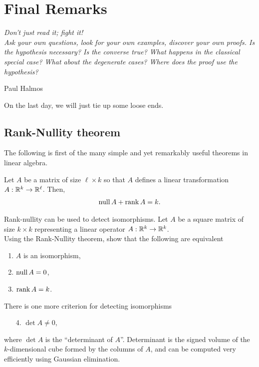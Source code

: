 

\section{Final Remarks}


\setlength{\epigraphwidth}{0.6\textwidth}
\epigraph{\it Don't just read it; fight it!\\
Ask your own questions, look for your own examples, discover your own proofs. Is the hypothesis necessary? Is the converse true? What happens in the classical special case? What about the degenerate cases? Where does the proof use the hypothesis? }{Paul Halmos}

On the last day, we will just tie up some loose ends.

\subsection{Rank-Nullity theorem}
The following is first of the many simple and yet remarkably useful theorems in linear algebra.
\begin{theorem}
  \label{theorem:rankNullityTheorem}
  Let $A$ be a matrix of size $\ell \times k$ so that $A$ defines a linear transformation $A: \mathbb{R}^k \rightarrow \mathbb{R}^\ell $. Then,
  \begin{align*}
    \operatorname{null} A + \operatorname{rank} A =  k.
  \end{align*}
\end{theorem}


\begin{qbox}
  Rank-nullity can be used to detect isomorphisms.
  Let $A$ be a square matrix of size $k \times k$ representing a linear operator $A:\mathbb{R}^k \rightarrow \mathbb{R}^k$.\\

  Using the Rank-Nullity theorem, show that the following are equivalent
      \begin{enumerate}
        \item $A$ is an isomorphism,
        \item $\operatorname{null} A = 0$,
        \item $\operatorname{rank} A = k$.\\
      \end{enumerate}
\end{qbox}

\begin{remark}
  There is one more criterion for detecting isomorphisms

    \begin{enumerate}
      \item[4.] $\det A \neq 0$,
    \end{enumerate}

  where $\det A$ is the ``determinant of $A$''. Determinant is the signed volume of the $k$-dimensional cube formed by the columns of $A$, and can be computed very efficiently using Gaussian elimination.
\end{remark}

